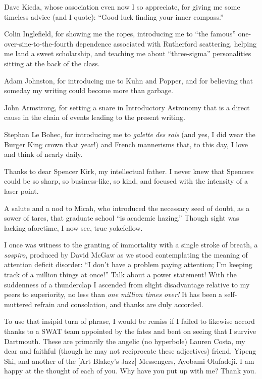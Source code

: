 Dave Kieda, whose association even now I so appreciate, for giving me some
timeless advice (and I quote): ``Good luck finding your inner compass.'' 

Colin Inglefield, for showing me the ropes, introducing me to ``the famous''
one-over-sine-to-the-fourth dependence associated with Rutherford scattering,
helping me land a sweet scholarship, and teaching me about ``three-sigma''
personalities sitting at the back of the class. 

Adam Johnston, for introducing me to Kuhn and Popper, and for believing that
someday my writing could become more than garbage. 

John Armstrong, for setting a snare in Introductory Astronomy that is a direct
cause in the chain of events leading to the present writing.

Stephan Le Bohec, for introducing me to \emph{galette des rois} (and yes, I did
wear the Burger King crown that year!) and French mannerisms that, to this day,
I love and think of nearly daily.

Thanks to dear Spencer Kirk, my intellectual father. I never knew that Spencers
could be so sharp, so business-like, so kind, and focused with the intensity of
a laser point.

A salute and a nod to Micah, who introduced the necessary seed of
doubt, as a sower of tares, that graduate school ``is academic
hazing.''  Though sight was lacking aforetime, I now see, true
yokefellow.

I once was witness to the granting of immortality with a single stroke of
breath, a \textsl{sospiro}, produced by David McGaw as we stood contemplating
the meaning of attention deficit disorder: ``I don't have a problem paying
attention; I'm keeping track of a million things at once!''  Talk about a power
statement! With the suddenness of a thunderclap I ascended from slight
disadvantage relative to my peers to superiority, no less than \emph{one million
  times over!}  It has been a self-muttered refrain and consolation, and thanks
are duly accorded.

To use that insipid turn of phrase, I would be remiss if I failed to likewise
accord thanks to a SWAT team appointed by the fates and bent on seeing that I
survive Dartmouth. These are primarily the angelic (no hyperbole) Lauren Costa,
my dear and faithful (though he may not reciprocate these adjectives) friend,
Yipeng Shi, and another of the [Art Blakey's Jazz] Messengers, Ayobami
Olufadeji. I am happy at the thought of each of you. Why have you put up with
me? Thank you.

